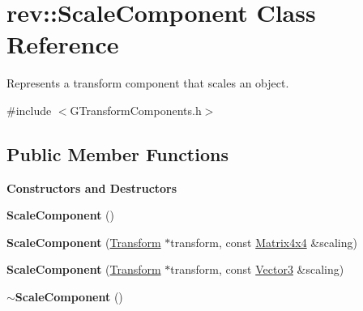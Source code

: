 \hypertarget{classrev_1_1_scale_component}{}\section{rev\+::Scale\+Component Class Reference}
\label{classrev_1_1_scale_component}


Represents a transform component that scales an object.  




{\ttfamily \#include $<$G\+Transform\+Components.\+h$>$}

\subsection*{Public Member Functions}
\begin{Indent}\textbf{ Constructors and Destructors}\par
\begin{DoxyCompactItemize}
\item 
\mbox{\label{classrev_1_1_scale_component_ac2ca5f05812c0771644ba5ab46283074}} 
{\bfseries Scale\+Component} ()
\item 
\mbox{\label{classrev_1_1_scale_component_ae701f7a49f652545f6e54dd04de32918}} 
{\bfseries Scale\+Component} (\mbox{\hyperlink{classrev_1_1_transform}{Transform}} $\ast$transform, const \mbox{\hyperlink{classrev_1_1_square_matrix}{Matrix4x4}} \&scaling)
\item 
\mbox{\label{classrev_1_1_scale_component_af72cf2bc9a9ae35511afb2c5860dfec3}} 
{\bfseries Scale\+Component} (\mbox{\hyperlink{classrev_1_1_transform}{Transform}} $\ast$transform, const \mbox{\hyperlink{classrev_1_1_vector}{Vector3}} \&scaling)
\item 
\mbox{\label{classrev_1_1_scale_component_a68b6eb240defa2aa1a0aad12a9904b2c}} 
{\bfseries $\sim$\+Scale\+Component} ()
\end{DoxyCompactItemize}
\end{Indent}
